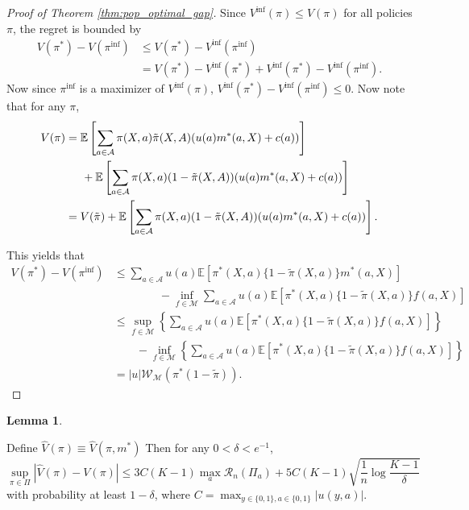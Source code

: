 \documentclass[12pt]{article}
\theoremstyle{definition}
\newtheorem{lemma}{Lemma}
\newcommand{\E}{\ensuremath{\mathbb{E}}}
\newcommand{\<}{\langle}
\renewcommand{\>}{\rangle}
\newcommand\mcal[1]{\ensuremath{\mathcal{#1}}}
\begin{document}
\begin{proof}[Proof of Theorem \ref{thm:pop_optimal_gap}]
  Since $V^{\inf}(\pi) \leq V(\pi)$ for all policies $\pi$, the regret is bounded by
  \[
    \begin{aligned}
      V(\pi^\ast) - V(\pi^{\inf}) & \leq V(\pi^\ast) - V^{\inf}(\pi^{\inf})\\
      & = V(\pi^\ast) - V^{\inf}(\pi^\ast) + V^{\inf}(\pi^\ast) - V^{\inf}(\pi^{\inf}).
    \end{aligned}
  \]
  Now since $\pi^{\inf}$ is a maximizer of $V^{\inf}(\pi)$, $V^{\inf}(\pi^\ast) - V^{\inf}(\pi^{\inf}) \leq 0$. Now note that for any $\pi$, 
  \begin{align*}
    V(\pi) & = \E\left[\sum_{a \in \mathcal{A}}\pi(X, a) \tilde{\pi}(X, A) (u(a) m^\ast(a, X) + c(a))\right] \\
    &\hspace{0.2in}+ \E\left[\sum_{a \in \mathcal{A}}\pi(X, a) (1 - \tilde{\pi}(X, A)) (u(a) m^\ast(a, X) + c(a))\right] \\
    & = V(\tilde{\pi}) + \E\left[\sum_{a \in \mathcal{A}}\pi(X, a) (1 - \tilde{\pi}(X, A)) (u(a) m^\ast(a, X) + c(a))\right].
  \end{align*}

  This yields that
  \begin{align*}
    V(\pi^\ast) - V(\pi^{\inf}) & \leq \sum_{a \in \mcal{A}} u(a) \E\left[\pi^\ast(X, a)\{1 - \tilde{\pi}(X, a)\} m^\ast(a,X)\right]\\
    & \qquad \qquad - \inf_{f \in \mcal{M}} \sum_{a \in \mcal{A}} u(a) \E\left[\pi^\ast(X, a)\{1 - \tilde{\pi}(X, a)\} f(a,X)\right]\\
    & \leq \sup_{f \in \mcal{M}} \left\{\sum_{a \in \mcal{A}} u(a) \E\left[\pi^\ast(X, a)\{1 - \tilde{\pi}(X, a)\} f(a,X)\right]\right\}\\
    & \qquad  - \inf_{f \in \mcal{M}} \left\{\sum_{a \in \mcal{A}} u(a) \E\left[\pi^\ast(X, a)\{1 - \tilde{\pi}(X, a)\} f(a,X)\right]\right\}\\
    & = |u| \mcal{W}_{\mcal{M}}\left(\pi^\ast (1 - \tilde{\pi})\right).
  \end{align*}
\end{proof}


\begin{lemma}
  \label{lem:rademacher_complexity}

  Define $\hat{V}(\pi) \equiv \hat{V}(\pi, m^\ast)$
  Then for any $0 < \delta < e^{-1}$,
  \[
    \sup_{\pi \in \Pi} |\hat{V}(\pi) - V(\pi)| \leq 3 C (K-1) \max_{a} \mathcal{R}_n(\Pi_a) + 5C(K-1) \sqrt{\frac{1}{n}\log \frac{K-1}{\delta}}
  \]
  with probability at least $1 -\delta$, where $C = \max_{y \in \{0,1\}, a \in \{0, 1\}} |u(y, a)|$.
\end{lemma}
\end{document}
